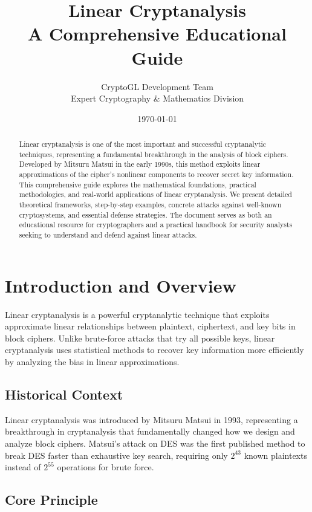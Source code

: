 \documentclass[12pt,a4paper]{article}
\title{\huge\textbf{Linear Cryptanalysis}\\
       \Large A Comprehensive Educational Guide}
\author{CryptoGL Development Team\\
        Expert Cryptography \& Mathematics Division}
\date{\today}
\begin{document}
\maketitle

\begin{abstract}
Linear cryptanalysis is one of the most important and successful cryptanalytic techniques, representing a fundamental breakthrough in the analysis of block ciphers. Developed by Mitsuru Matsui in the early 1990s, this method exploits linear approximations of the cipher's nonlinear components to recover secret key information. This comprehensive guide explores the mathematical foundations, practical methodologies, and real-world applications of linear cryptanalysis. We present detailed theoretical frameworks, step-by-step examples, concrete attacks against well-known cryptosystems, and essential defense strategies. The document serves as both an educational resource for cryptographers and a practical handbook for security analysts seeking to understand and defend against linear attacks.
\end{abstract}

\tableofcontents
\newpage

\section{Introduction and Overview}

Linear cryptanalysis is a powerful cryptanalytic technique that exploits approximate linear relationships between plaintext, ciphertext, and key bits in block ciphers. Unlike brute-force attacks that try all possible keys, linear cryptanalysis uses statistical methods to recover key information more efficiently by analyzing the bias in linear approximations.

\subsection{Historical Context}

Linear cryptanalysis was introduced by Mitsuru Matsui in 1993, representing a breakthrough in cryptanalysis that fundamentally changed how we design and analyze block ciphers. Matsui's attack on DES was the first published method to break DES faster than exhaustive key search, requiring only $2^{43}$ known plaintexts instead of $2^{55}$ operations for brute force.

\subsection{Core Principle}
\end{document}
